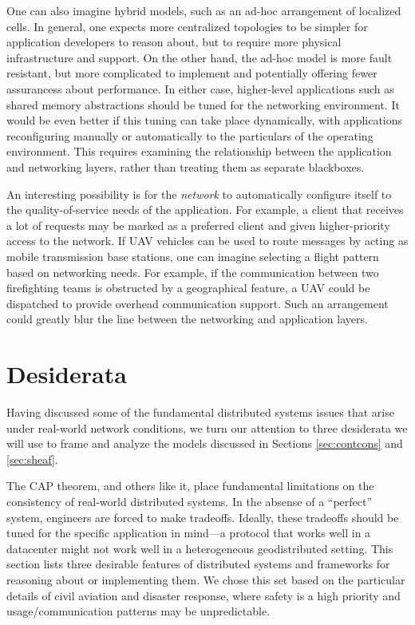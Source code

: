 \documentclass[]             %
{NASA}                       %
\theoremstyle{definition}
\begin{document}
One can also imagine hybrid models, such as an ad-hoc arrangement of
localized cells. In general, one expects more centralized topologies to
be simpler for application developers to reason about, but to require
more physical infrastructure and support. On the other hand, the ad-hoc
model is more fault resistant, but more complicated to implement and
potentially offering fewer assurancess about performance. In either
case, higher-level applications such as shared memory abstractions
should be tuned for the networking environment. It would be even better
if this tuning can take place dynamically, with applications
reconfiguring manually or automatically to the particulars of the
operating environment. This requires examining the relationship between
the application and networking layers, rather than treating them as
separate blackboxes.

An interesting possibility is for the \emph{network} to automatically
configure itself to the quality-of-service needs of the application. For
example, a client that receives a lot of requests may be marked as a
preferred client and given higher-priority access to the network. If UAV
vehicles can be used to route messages by acting as mobile transmission
base stations, one can imagine selecting a flight pattern based on
networking needs. For example, if the communication between two
firefighting teams is obstructed by a geographical feature, a UAV could
be dispatched to provide overhead communication support. Such an
arrangement could greatly blur the line between the networking and
application layers.

\hypertarget{desiderata}{%
\section{Desiderata}\label{desiderata}}

\label{sec:des}

Having discussed some of the fundamental distributed systems issues that
arise under real-world network conditions, we turn our attention to
three desiderata we will use to frame and analyze the models discussed
in Sections \ref{sec:contcons} and \ref{sec:sheaf}.

The CAP theorem, and others like it, place fundamental limitations on
the consistency of real-world distributed systems. In the absense of a
``perfect'' system, engineers are forced to make tradeoffs. Ideally,
these tradeoffs should be tuned for the specific application in mind---a
protocol that works well in a datacenter might not work well in a
heterogeneous geodistributed setting. This section lists three desirable
features of distributed systems and frameworks for reasoning about or
implementing them. We chose this set based on the particular details of
civil aviation and disaster response, where safety is a high priority
and usage/communication patterns may be unpredictable.
\end{document}
